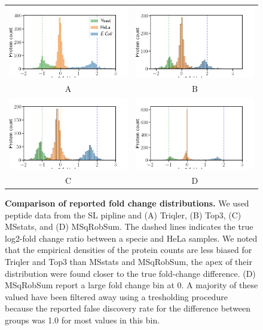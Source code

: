 \documentclass[10pt,letterpaper]{article}
\begin{document}
\begin{figure}[hbt]
    \centering
    \begin{tabular}{cc}
	    \includegraphics[width=0.4\linewidth]{../../result/report_plots_filtered/osw_triqler_intensity.png} & 
	    \includegraphics[width=0.4\linewidth]{../../result/report_plots_filtered/osw_top3_intensity.png} \\ 
        A & B \\ 
	    \includegraphics[width=0.4\linewidth]{../../result/report_plots_filtered/osw_msstats_intensity.png} & 
	    \includegraphics[width=0.4\linewidth]{../../result/report_plots_filtered/osw_msqrobsum_intensity.png} \\
        C & D 
    \end{tabular}
    \caption{{\bf Comparison of reported fold change distributions.} We used peptide data from the SL pipline and (A) Triqler, (B) Top3, (C) MSstats, and (D) MSqRobSum. The dashed lines indicates the true log2-fold change ratio between a specie and HeLa samples. We noted that the empirical densities of the protein counts are less biased for Triqler and Top3 than MSstats and MSqRobSum, the apex of their distribution were found closer to the true fold-change difference. (D) MSqRobSum report a large fold change bin at 0. A majority of these valued have been filtered away using a tresholding procedure because the reported false discovery rate for the difference between groups was 1.0 for most values in this bin. \label{fig:fc_histogram}}
\end{figure}
\end{document}
